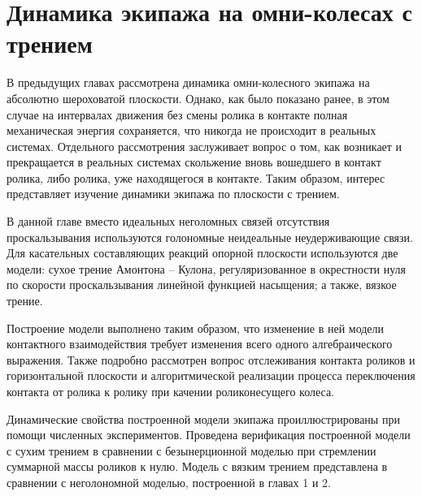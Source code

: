 \chapter{Динамика экипажа на омни-колесах с трением}

В предыдущих главах рассмотрена динамика омни-колесного экипажа на абсолютно шероховатой плоскости. Однако, как было показано ранее, в этом случае на интервалах движения без смены ролика в контакте полная механическая энергия сохраняется, что никогда не происходит в реальных системах.
Отдельного рассмотрения заслуживает вопрос о том, как возникает и прекращается в реальных системах скольжение вновь вошедшего в контакт ролика, либо ролика, уже находящегося в контакте.
Таким образом, интерес представляет изучение динамики экипажа по плоскости с трением.

В данной главе вместо идеальных неголомных связей отсутствия проскальзывания используются голономные неидеальные неудерживающие связи. Для касательных составляющих реакций опорной плоскости используются две модели: сухое трение Амонтона -- Кулона, регуляризованное в окрестности нуля по скорости проскальзывания линейной функцией насыщения; а также, вязкое трение.

Построение модели выполнено таким образом, что изменение в ней модели контактного взаимодействия требует изменения всего одного алгебраического выражения. Также подробно рассмотрен вопрос отслеживания контакта роликов и горизонтальной плоскости и алгоритмической реализации процесса переключения контакта от ролика к ролику при качении  роликонесущего колеса.

Динамические свойства построенной модели экипажа проиллюстрированы при помощи численных экспериментов. Проведена верификация построенной модели с сухим трением в сравнении с безынерционной моделью при стремлении суммарной массы роликов к нулю. Модель с вязким трением представлена в сравнении с неголономной моделью, построенной в главах 1 и 2.